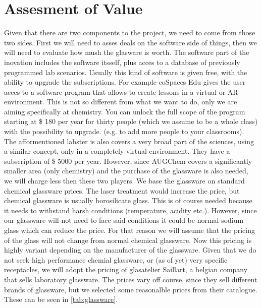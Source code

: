 \documentclass[%
    paper=A4,               %
    twoside=true,           %
    openany,              %
    parskip=full,           %
    chapterprefix=true,     %
    11pt,                   %
    headings=normal,        %
    bibliography=totoc,     %
    listof=totoc,           %
    titlepage=on,           %
    captions=tableabove,    %
    draft=false,            %
]{scrreprt}
\numberwithin{equation}{section}
\begin{document}
    \section{Assesment of Value}
    \label{sec:assesment}
    Given that there are two components to the project, we need to come from those two sides. First we will need to asses deals on the software side of things, then we will need to
    evaluate how mush the glasware is worth. \n
    The software part of the inovation includes the software itsself, plus acces to a database of previously programmed lab scenarios. Usually this kind of software is given free,
    with the ability to upgrade the subscriptions. For example coSpaces Edu gives the user acces to a software program that allows to create lessons in a virtual or AR environment. 
    This is not so different from what we want to do, only we are aiming specifically at chemistry. You can unlock the full scope of the program starting at \$ 180 per year for
    thirty people (which we assume to be a whole class) with the possibility to upgrade. (e.g. to add more people to your classrooms). The afformentioned labster is also covers a 
    very broad part of the sciences, using a similar concept, only in a completely virtual environment. They have a subscription of \$ 5000 per year. However, since AUGChem covers
    a significantly smaller area (only chemistry) and the purchase of the glassware is also needed, we will charge less then these two players. \n
    We base the glassware on standard chemical glassware prices. The laser treatment would increase the price, but chemical glassware is usually borosilicate glass. This is of course
    needed because it needs to withstand harsh conditions (temperature, acidity etc.). However, since our glassware will not need to face said conditions it could be normal sodium
    glass which can reduce the price. For that reason we will assume that the pricing of the glass will not change from normal chemical glassware. Now this pricing is highly variant 
    depending on the manufacturer of the glassware. Given that we do not seek high performance chemial glassware, or (as of yet) very specific receptacles, we will adopt the 
    pricing of glasatelier Saillart, a belgian company that sells laboratory glassware. The prices vary off course, since they sell different brands of glassware, but we selected some
    reasonalble prices from their catalogue. These can be seen in \ref{tab:glassware}.
\end{document}
